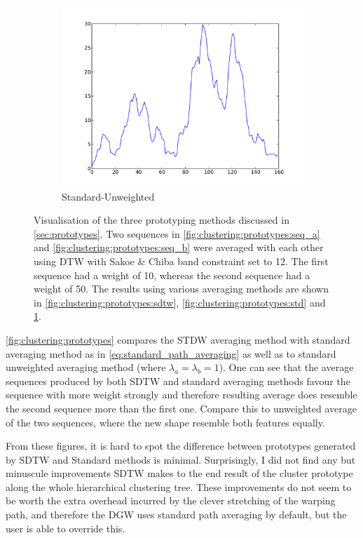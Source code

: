 \documentclass[parskip]{cs4rep}
\begin{document}
\begin{figure}
\begin{subfigure}[b]{0.31\textwidth}
        \includegraphics[width=\textwidth]{figures/clustering/prototypes/unweighted.pdf}
        \caption{Standard-Unweighted}
        \label{fig:clustering:prototypes:unweighted}
    \end{subfigure}
    \caption{Visualisation of the three prototyping methods discussed in \autoref{sec:prototypes}. Two sequences in \ref{fig:clustering:prototypes:seq_a} and \ref{fig:clustering:prototypes:seq_b} were averaged with each other using DTW with Sakoe & Chiba band constraint set to 12. The first sequence had a weight of 10, whereas the second sequence had a weight of 50. The results using various averaging methods are shown in \ref{fig:clustering:prototypes:sdtw}, \ref{fig:clustering:prototypes:std} and \ref{fig:clustering:prototypes:unweighted}.}
    \label{fig:clustering:prototypes}
\end{figure}

\autoref{fig:clustering:prototypes} compares the STDW averaging method with standard averaging method as in \autoref{eq:standard_path_averaging} as well as to standard unweighted averaging method (where $\lambda_a = \lambda_b = 1$). One can see that the average sequences produced by both SDTW and standard averaging methods favour the sequence with more weight strongly and therefore resulting average does resemble the second sequence more than the first one. Compare this to unweighted average of the two sequences, where the new shape resemble both features equally. 

From these figures, it is hard to spot the difference between prototypes generated by SDTW and Standard methods is minimal. Surprisingly, I did not find any but minuscule improvements SDTW makes to the end result of the cluster prototype along the whole hierarchical clustering tree. These improvements do not seem to be worth the extra overhead incurred by the clever stretching of the warping path, and therefore the DGW uses standard path averaging by default, but the user is able to override this.
\end{document}
